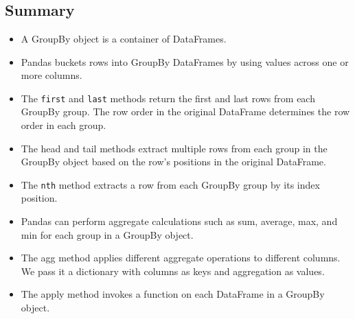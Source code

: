 \chapter{\label{Ch09}}
\section{Summary}
\begin{itemize}
    \item A GroupBy object is a container of DataFrames.
    \item Pandas buckets rows into GroupBy DataFrames by using values across one or more columns.
    \item The \verb|first| and \verb|last| methods return the first and last rows from each GroupBy group. The row order in the original DataFrame determines the row order in each group.
    \item The head and tail methods extract multiple rows from each group in the GroupBy object based on the row’s positions in the original DataFrame.
    \item The \verb|nth| method extracts a row from each GroupBy group by its index position.
    \item Pandas can perform aggregate calculations such as sum, average, max, and min for each group in a GroupBy object.
    \item The agg method applies different aggregate operations to different columns. We pass it a dictionary with columns as keys and aggregation as values.
    \item The apply method invokes a function on each DataFrame in a GroupBy object.
\end{itemize}